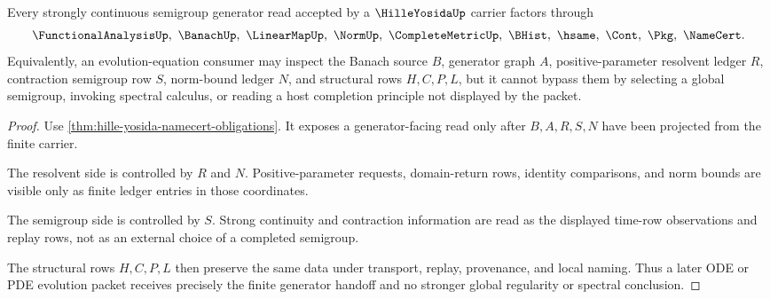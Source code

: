 \begin{theorem}
\label{thm:hille-yosida-semigroup-generator-handoff}
Every strongly continuous semigroup generator read accepted by a $\HilleYosidaUp$ carrier factors through
$$
\FunctionalAnalysisUp,\ \BanachUp,\ \LinearMapUp,\ \NormUp,\ \CompleteMetricUp,\ \BHist,\ \hsame,\ \Cont,\ \Pkg,\ \NameCert .
$$
Equivalently, an evolution-equation consumer may inspect the Banach source $B$, generator graph $A$, positive-parameter resolvent ledger $R$, contraction semigroup row $S$, norm-bound ledger $N$, and structural rows $H,C,P,L$, but it cannot bypass them by selecting a global semigroup, invoking spectral calculus, or reading a host completion principle not displayed by the packet.
\end{theorem}
\begin{proof}
Use \autoref{thm:hille-yosida-namecert-obligations}. It exposes a generator-facing read only after $B,A,R,S,N$ have been projected from the finite carrier.

The resolvent side is controlled by $R$ and $N$. Positive-parameter requests, domain-return rows, identity comparisons, and norm bounds are visible only as finite ledger entries in those coordinates.

The semigroup side is controlled by $S$. Strong continuity and contraction information are read as the displayed time-row observations and replay rows, not as an external choice of a completed semigroup.

The structural rows $H,C,P,L$ then preserve the same data under transport, replay, provenance, and local naming. Thus a later ODE or PDE evolution packet receives precisely the finite generator handoff and no stronger global regularity or spectral conclusion.
\end{proof}




